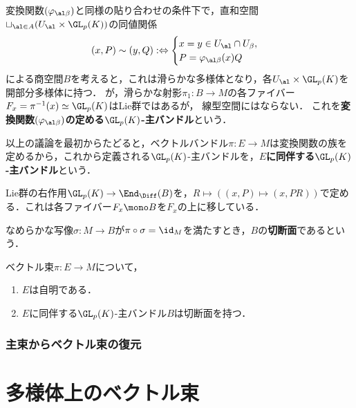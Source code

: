\documentclass[uplatex,dvipdfmx]{jsreport}
\begin{document}
\begin{definition}\label{def-principle-budle}
    変換関数$(\varphi_{\al\beta})$と同様の貼り合わせの条件下で，直和空間$\sqcup_{\al\in A}(U_\al\times\GL_p(K))$の同値関係
    \[(x,P)\sim(y,Q):\Leftrightarrow\begin{cases}
        x=y\in U_\al\cap U_\beta,\\
        P=\varphi_{\al\beta}(x)Q
    \end{cases}\]
    による商空間$B$を考えると，これは滑らかな多様体となり，各$U_\al\times\GL_p(K)$を開部分多様体に持つ．
    が，滑らかな射影$\pi_1:B\to M$の各ファイバー$F_x=\pi^{-1}(x)\simeq\GL_p(K)$はLie群ではあるが，
    線型空間にはならない．
    これを\textbf{変換関数$(\varphi_{\al\beta})$の定める$\GL_p(K)$-主バンドル}という．
\end{definition}
\begin{remark}
    以上の議論を最初からたどると，ベクトルバンドル$\pi:E\to M$は変換関数の族を定めるから，これから定義される$\GL_p(K)$-主バンドルを，\textbf{$E$に同伴する$\GL_p(K)$-主バンドル}という．
\end{remark}

\begin{definition}
    Lie群の右作用$\GL_p(K)\to\End_\Diff(B)$を，$R\mapsto ((x,P)\mapsto(x,PR))$で定める．これは各ファイバー$F_x\mono B$を$F_x$の上に移している．
\end{definition}

\begin{definition}[section]
    なめらかな写像$\sigma:M\to B$が$\pi\circ\sigma=\id_M$を満たすとき，$B$の\textbf{切断面}であるという．
\end{definition}

\begin{theorem}
    ベクトル束$\pi:E\to M$について，
    \begin{enumerate}
        \item $E$は自明である．
        \item $E$に同伴する$\GL_p(K)$-主バンドル$B$は切断面を持つ．
    \end{enumerate}
\end{theorem}

\subsection{主束からベクトル束の復元}

\chapter{多様体上のベクトル束}
\end{document}
